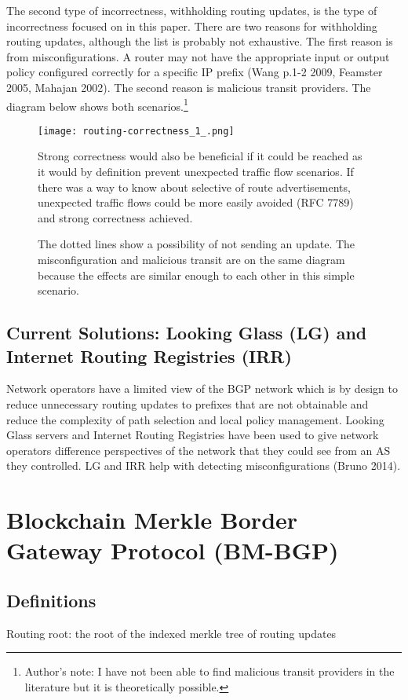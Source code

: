 \documentclass[letterpaper, 10 pt, conference]{ieeeconf}  %
\begin{document}
The second type of incorrectness, withholding routing updates, is the type of incorrectness focused on in this paper. There are two reasons for withholding routing updates, although the list is probably not exhaustive. The first reason is from misconfigurations. A router may not have the appropriate input or output policy configured correctly for a specific IP prefix (Wang p.1-2 2009, Feamster 2005, Mahajan 2002). The second reason is malicious transit providers. The diagram below shows both scenarios.\footnote{Author's note: I have not been able to find malicious transit providers in the literature but it is theoretically possible.}

\begin{figure}[!ht]
	\centering
	\texttt{[image: routing-correctness\_1\_.png]}
    \caption{The dotted lines show a possibility of not sending an update. The misconfiguration and malicious transit are on the same diagram because the effects are similar enough to each other in this simple scenario.  
}

Strong correctness would also be beneficial if it could be reached as it would by definition prevent unexpected traffic flow scenarios. If there was a way to know about selective of route advertisements, unexpected traffic flows could be more easily avoided (RFC 7789) and strong correctness achieved. 

\end{figure}

\subsection{Current Solutions: Looking Glass (LG) and Internet Routing Registries (IRR)}

Network operators have a limited view of the BGP network which is by design to reduce unnecessary routing updates to prefixes that are not obtainable and reduce the complexity of path selection and local policy management. Looking Glass servers and Internet Routing Registries have been used to give network operators difference perspectives of the network that they could see from an AS they controlled. LG and IRR help with detecting misconfigurations (Bruno 2014).

\section{Blockchain Merkle Border Gateway Protocol (BM-BGP)}

\subsection{Definitions}
Routing root: the root of the indexed merkle tree of routing updates
\end{document}
